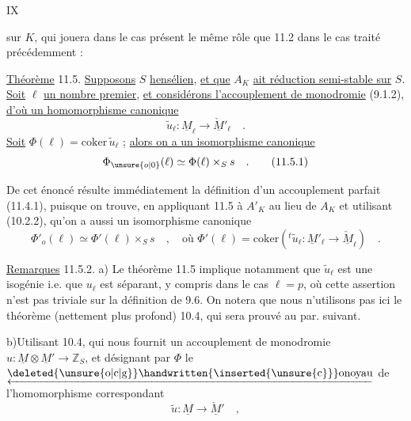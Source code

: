 \hfill IX

sur $K$, qui jouera dans le cas présent le même rôle que 11.2 dans le cas traité précédemment :

\uline{Théorème} 11.5. \uline{Supposons} $S$ \uline{hensélien}, \uline{et que} $A_K$ \uline{ait réduction semi-stable sur} $S$. \uline{Soit} $\ell$ \uline{un nombre premier}, \uline{et considérons l'accouplement de monodromie} (9.1.2), \uline{d'où un homomorphisme canonique}
\[
 \widetilde u_\ell:\underline M_\ell\longrightarrow\underline{\check M}'_\ell\quad .
\]
\uline{Soit} $\Phi(\ell)=\mathrm{coker}\,\widetilde u_\ell$ ; \uline{alors on a un isomorphisme canonique}
\[
 \Phi_{\unsure{o|0}}(\ell)\simeq\Phi(\ell)\times_S s\quad .\tag*{(11.5.1)}
\]

De cet énoncé résulte immédiatement la définition d'un accouplement parfait (11.4.1), puisque on trouve, en appliquant 11.5 à $A'_K$ au lieu de $A_K$ et utilisant (10.2.2), qu'on a aussi un isomorphisme canonique
\[
 \Phi'_o(\ell)\simeq\Phi'(\ell)\times_S s\quad,\quad\text{où }\Phi'(\ell)=\mathrm{coker}({}^t\widetilde u_\ell:\underline M'_\ell\longrightarrow\underline{\check M}_\ell)\quad .
\]

\uline{Remarques} 11.5.2. a) Le théorème 11.5 implique notamment que $\widetilde u_\ell$ est une isogénie i.e. que $u_\ell$ est séparant, y compris dans le cas $\ell=p$, où cette assertion n'est pas triviale sur la définition de 9.6. On notera que nous n'utilisons pas ici le théorème (nettement plus profond) 10.4, qui sera prouvé au par. suivant.

b)\quad Utilisant 10.4, qui nous fournit un accouplement de monodromie $u:\underline M\otimes\underline M'\longrightarrow\mathbb Z_S$, et désignant par $\Phi$ le $\underleftarrow{\text{\deleted{\unsure{o|c|g}}\handwritten{\inserted{\unsure{c}}}onoyau}}$ de l'homomorphisme correspondant
\[
 \widetilde u:\underline M\longrightarrow\underline{\check M}'\quad ,
\]
